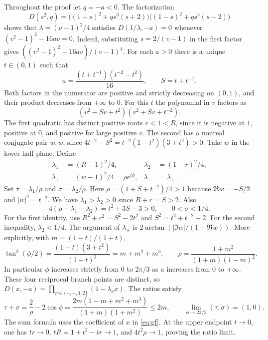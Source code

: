 \documentclass[11pt]{article}
\begin{document}
Throughout the proof let $q=-a<0$. The factorization
\[
D(s^2,q)=\big((1+s)^2+qs^3(s+2)\big)\big((1-s)^2+qs^3(s-2)\big)
\]
shows that $\lambda=(v-1)^2/4$ satisfies $D(1/\lambda,-a)=0$ whenever $(v^2-1)^2-16av=0$. Indeed, substituting $s=2/(v-1)$ in the first factor gives $((v^2-1)^2-16av)/(v-1)^4$. For each $a>0$ there is a unique $t\in(0,1)$ such that
\[
a=\frac{(t+t^{-1})(t^{-2}-t^2)}{16},\qquad
S=t+t^{-1}.
\]
Both factors in the numerator are positive and strictly decreasing on $(0,1)$, and their product decreases from $+\infty$ to $0$. For this $t$ the polynomial in $v$ factors as
\[
(v^2-Sv+t^2)(v^2+Sv+t^{-2}).
\]
The first quadratic has distinct positive roots $r<1<R$, since it is negative at $1$, positive at $0$, and positive for large positive $v$. The second has a nonreal conjugate pair $w,\bar w$, since $4t^{-2}-S^2=t^{-2}(1-t^2)(3+t^2)>0$. Take $w$ in the lower half-plane. Define
\begin{align*}
\lambda_1&=(R-1)^2/4, & \lambda_2&=(1-r)^2/4,\\
\lambda_+&=(w-1)^2/4=\rho e^{i\phi}, & \lambda_-&=\overline{\lambda_+}.
\end{align*}
Set $\tau=\lambda_1/\rho$ and $\sigma=\lambda_2/\rho$.
Here $\rho=(1+S+t^{-2})/4>1$ because $\Re w=-S/2$ and $|w|^2=t^{-2}$. We have $\lambda_1>\lambda_2>0$ since $R+r=S>2$. Also
\begin{equation}
4(\rho-\lambda_1-\lambda_2)=t^2+3S-3>0,\qquad 0<\sigma<1/4.
\label{eq:modulus-order}
\end{equation}
For the first identity, use $R^2+r^2=S^2-2t^2$ and $S^2=t^2+t^{-2}+2$. For the second inequality, $\lambda_2<1/4$. The argument of $\lambda_+$ is $2\arctan(|\Im w|/(1-\Re w))$. More explicitly, with $m=(1-t)/(1+t)$,
\begin{equation}
\tan^2(\phi/2)=\frac{(1-t)(3+t^2)}{(1+t)^3}=m+m^2+m^3,\qquad
\rho=\frac{1+m^2}{(1+m)(1-m)^2}.
\label{eq:param}
\end{equation}
In particular $\phi$ increases strictly from $0$ to $2\pi/3$ as $a$ increases from $0$ to $+\infty$. These four reciprocal branch points are distinct, so
$D(x,-a)=\prod_{\nu\in\{+,-,1,2\}}(1-\lambda_\nu x)$.
The ratios satisfy
\begin{equation}
\tau+\sigma=\frac2{\rho}-2\cos\phi
  =\frac{2m(1-m+m^2+m^3)}{(1+m)(1+m^2)}\leq 2m,
\qquad
\lim_{\phi\to 2\pi/3}(\tau,\sigma)=(1,0).
\label{eq:ratios}
\end{equation}
The sum formula uses the coefficient of $x$ in \eqref{eq:gf}. At the upper endpoint $t\to0$, one has $tr\to0$, $tR=1+t^2-tr\to1$, and $4t^2\rho\to1$, proving the ratio limit.
\end{document}
